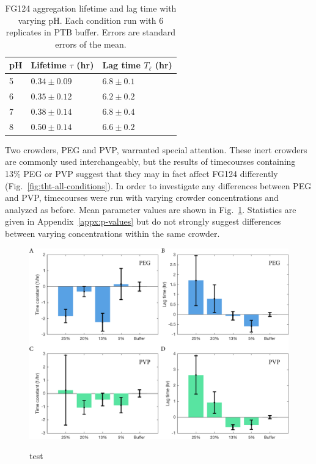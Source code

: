 \begin{table}[b!]
\centering
  \caption[Aggregation lifetime and lag time with varying pH.]{FG124 aggregation lifetime and lag time with varying pH. Each condition run with 6 replicates in PTB buffer.  Errors are standard errors of the mean.}
    \label{table:FG124-pH}
    \begin{tabular}{p{1cm}p{3cm}p{3cm}}
      pH & Lifetime $\tau$ (hr) & Lag time $T_\ell$ (hr) \\
      \hline
      5 & $0.34 \pm 0.09$ & $6.8 \pm 0.1$ \\
      6 & $0.35 \pm 0.12$ & $6.2 \pm 0.2$ \\
      7 & $0.38 \pm 0.14$ & $6.8 \pm 0.4$ \\
      8 & $0.50 \pm 0.14$ & $6.6 \pm 0.2$ \\
    \end{tabular}
\end{table}

Two crowders, PEG and PVP, warranted special attention.  These inert crowders are commonly used interchangeably, but the results of timecourses containing 13\% PEG or PVP suggest that they may in fact affect FG124 differently (Fig.~\ref{fig:tht-all-conditions}).  In order to investigate any differences between PEG and PVP, timecourses were run with varying crowder concentrations and analyzed as before.  Mean parameter values are shown in Fig.~\ref{fig:peg-pvp}.  Statistics are given in Appendix~\ref{appx:p-values} but do not strongly suggest differences between varying concentrations within the same crowder.

\begin{figure}
\caption{test}
\centering
\includegraphics[width=\textwidth]{figs/ch05/peg-and-pvp-charts.pdf}
\label{fig:peg-pvp}
\end{figure}

